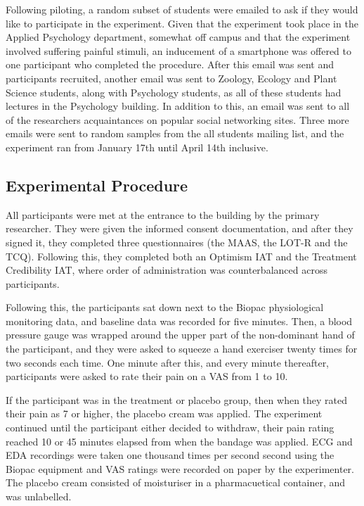 Following piloting, a random subset of students were emailed to ask if they would like to participate in the experiment. Given that the experiment took place in the Applied Psychology department, somewhat off campus and that the experiment involved suffering painful stimuli, an inducement of a smartphone was offered to one participant who completed the procedure. After this email was sent and participants recruited, another email was sent to Zoology, Ecology and Plant Science students, along with Psychology students, as all of these students had lectures in the Psychology building. In addition to this, an email was sent to all of the researchers acquaintances on popular social networking sites. Three more emails were sent to random samples from the all students mailing list, and the experiment ran from January 17th until April 14th inclusive. 

\subsection{Experimental Procedure}

All participants were met at the entrance to the building by the primary researcher. They were given the informed consent documentation, and after they signed it, they completed three questionnaires (the MAAS, the LOT-R and the TCQ). Following this, they completed both an Optimism IAT and the Treatment Credibility IAT, where order of administration was counterbalanced across participants. 

Following this, the participants sat down next to the Biopac physiological monitoring data, and baseline data was recorded for five minutes.  Then, a blood pressure gauge was wrapped around the upper part of the non-dominant hand of the participant, and they were asked to squeeze a hand exerciser twenty times for two seconds each time. One minute after this, and every minute thereafter, participants were asked to rate their pain on a VAS from 1 to 10. 

If the participant was in the treatment or placebo group, then when they rated their pain as 7 or higher, the placebo cream was applied. The experiment continued until the participant either decided to withdraw, their pain rating reached 10 or 45 minutes elapsed  from when the bandage was applied. ECG and EDA recordings were taken one thousand times per second second using the Biopac equipment and VAS ratings were recorded on paper by the experimenter. The placebo cream consisted of moisturiser in a pharmacuetical container, and was unlabelled. 

